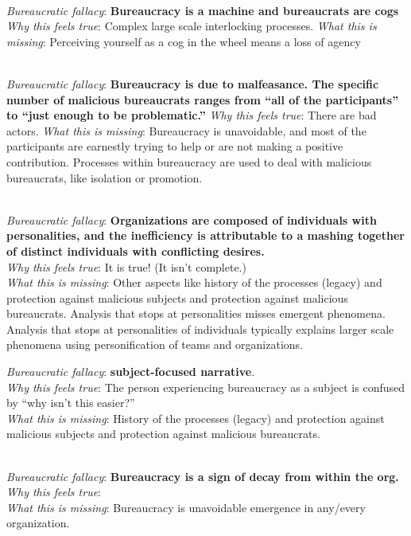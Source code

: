 \ \\

\textit{Bureaucratic fallacy}: \textbf{Bureaucracy is a machine and bureaucrats are cogs}
\textit{Why this feels true}: Complex large scale interlocking processes.
\textit{What this is missing}: Perceiving yourself as a cog in the wheel means a loss of agency


\ \\

\textit{Bureaucratic fallacy}: \textbf{Bureaucracy is due to malfeasance. The specific number of malicious bureaucrats ranges from ``all of the participants'' to ``just enough to be problematic.''} 
\textit{Why this feels true}: There are bad actors. 
\textit{What this is missing}: Bureaucracy is unavoidable, and most of the participants are earnestly trying to help or are not making a positive contribution. Processes within bureaucracy are used to deal with malicious bureaucrats, like isolation or promotion. 

\ \\

\textit{Bureaucratic fallacy}: \textbf{Organizations are composed of individuals with personalities, and the inefficiency is attributable to a mashing together of distinct individuals with conflicting desires.} \\
\textit{Why this feels true}: It is true! (It isn't complete.) \\
\textit{What this is missing}: Other aspects like history of the processes (legacy) and protection against malicious subjects and protection against malicious bureaucrats. Analysis that stops at personalities misses emergent phenomena. Analysis that stops at personalities of individuals typically explains larger scale phenomena using personification of teams and organizations. 


\textit{Bureaucratic fallacy}: \textbf{subject-focused narrative}. \\
\textit{Why this feels true}: The person experiencing bureaucracy as a subject is confused by ``why isn't this easier?''  \\
\textit{What this is missing}: History of the processes (legacy) and protection against malicious subjects and protection against malicious bureaucrats. 

\ \\

\textit{Bureaucratic fallacy}: \textbf{Bureaucracy is a sign of decay from within the org.}
\textit{Why this feels true}: \\
\textit{What this is missing}: Bureaucracy is unavoidable emergence in any/every organization.

